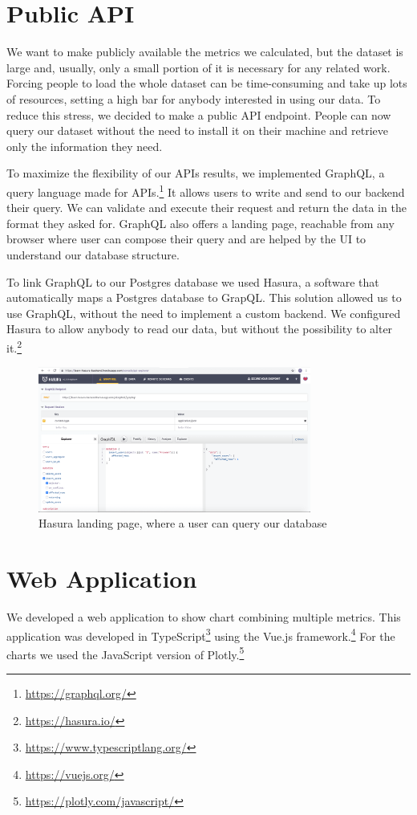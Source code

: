 \section{Public API}
\label{sec:publicapi}
We want to make publicly available the metrics we calculated, but the dataset is large and, usually, only a small portion of it is necessary for any related work. Forcing people to load the whole dataset can be time-consuming and take up lots of resources, setting a high bar for anybody interested in using our data. To reduce this stress, we decided to make a public API endpoint. People can now query our dataset without the need to install it on their machine and retrieve only the information they need.

To maximize the flexibility of our APIs results, we implemented GraphQL, a query language made for APIs.\footnote{\url{https://graphql.org/}} It allows users to write and send to our backend their query. We can validate and execute their request and return the data in the format they asked for. GraphQL also offers a landing page, reachable from any browser where user can compose their query and are helped by the UI to understand our database structure.

To link GraphQL to our Postgres database we used Hasura, a software that automatically maps a Postgres database to GrapQL. This solution allowed us to use GraphQL, without the need to implement a custom backend. We configured Hasura to allow anybody to read our data, but without the possibility to alter it.\footnote{\url{https://hasura.io/}}

\begin{figure}[H]
    \centering
    \includegraphics[width=0.8\textwidth]{./img/hasura.png}
    \caption{Hasura landing page, where a user can query our database}
    \label{fig:hasura}
\end{figure}

\section{Web Application}
\label{sec:webapplication}
We developed a web application to show chart combining multiple metrics. This application was developed in TypeScript\footnote{\url{https://www.typescriptlang.org/}} using the Vue.js framework.\footnote{\url{https://vuejs.org/}} For the charts we used the JavaScript version of Plotly.\footnote{\url{https://plotly.com/javascript/}}

